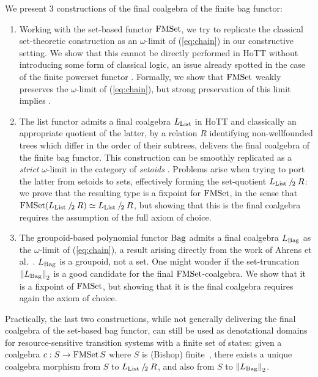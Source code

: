 \documentclass[a4paper,USenglish,cleveref]{lipics-v2021}
\begin{document}
We present 3 constructions of the final coalgebra of the finite bag functor:
\begin{enumerate}
\item Working with the set-based functor $\FMSet$, we try to replicate the classical set-theoretic construction as an $\omega$-limit of (\ref{eq:chain}) in our constructive setting. We show that this cannot be directly performed in HoTT without introducing some form of classical logic, an issue already spotted in the case of the finite powerset functor \cite{Veltri2021}. Formally, we show that $\FMSet$ weakly preserves the $\omega$-limit of (\ref{eq:chain}),
but strong preservation of this limit implies \LLPO{}.
\item The list functor admits a final coalgebra $\Lim{\List}$ in HoTT \cite{Ahrens2015} and classically an appropriate quotient of the latter, by a relation $R$ identifying non-wellfounded trees which differ in the order of their subtrees, delivers the final coalgebra of the finite bag functor. This construction can be smoothly replicated as a \emph{strict} $\omega$-limit in the category of \emph{setoids} \cite{Barthe2003}. Problems arise when trying to port the latter from setoids to sets, effectively forming the set-quotient $\Lim{\List} \mathbin{/_{\!2}} R$: we prove that the resulting type is a fixpoint for $\FMSet$, in the sense that $\FMSet (\Lim{\List} \mathbin{/_{\!2}} R) \simeq \Lim{\List} \mathbin{/_{\!2}} R$, but showing that this is the final coalgebra requires the assumption of the full axiom of choice. 
\item The groupoid-based polynomial functor $\Bag$ admits a final coalgebra $\Lim{\Bag}$ as the $\omega$-limit of (\ref{eq:chain}), a result arising directly from the work of Ahrens et al.~\cite{Ahrens2015}. $\Lim{\Bag}$ is a groupoid, not a set. One might wonder if the set-truncation $\SetTrunc{\Lim{\Bag}}$ is a good candidate for the final $\FMSet$-coalgebra. We  show that it is a fixpoint of $\FMSet$, but showing that it is the final coalgebra requires again the axiom of choice. 
\end{enumerate}
Practically, the last two constructions, while not generally delivering the final coalgebra of the set-based bag functor, can still be used as denotational domains for resource-sensitive transition systems with a finite set of states: given a coalgebra $c : S \to \FMSet S$ where $S$ is (Bishop) finite~\cite{Frumin2018}, there exists a unique coalgebra morphism from $S$ to $\Lim{\List} \mathbin{/_{\!2}} R$, and also from $S$ to $\SetTrunc{\Lim{\Bag}}$.
\end{document}
